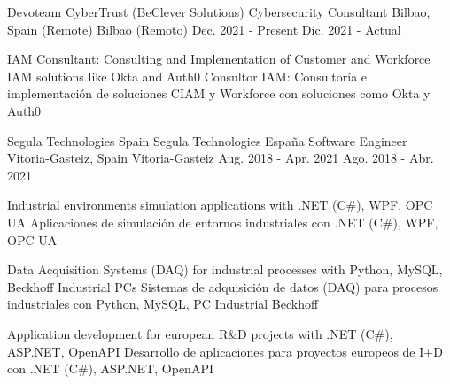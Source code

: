 	{}
	{}

\begin{cventries}
		
	\cventry
		{
			Devoteam CyberTrust (BeClever Solutions)
		} %
		{
			Cybersecurity Consultant
		} %
		{
				{Bilbao, Spain (Remote)}
				{Bilbao  (Remoto)}
		} %
		{
				{Dec. 2021 - Present}
				{Dic. 2021 - Actual}
		} %
		{
			\begin{cvitems} %
				\item {
						{IAM Consultant: Consulting and Implementation of Customer and Workforce IAM solutions like Okta and Auth0}
						{Consultor IAM: Consultoría e implementación de soluciones CIAM y Workforce con soluciones como Okta y Auth0}
					}
			\end{cvitems}
		}
		
	\cventry
	{
			{Segula Technologies Spain}
			{Segula Technologies España}
	} %
	{
		Software Engineer 
	} %
	{
			{Vitoria-Gasteiz, Spain}
			{Vitoria-Gasteiz}
	} %
	{
			{Aug. 2018 - Apr. 2021}
			{Ago. 2018 - Abr. 2021}
	} %
	{
		\begin{cvitems} %
			\item {
					{Industrial environments simulation applications with .NET (C\#), WPF, OPC UA}
					{Aplicaciones de simulación de entornos industriales con .NET (C\#), WPF, OPC UA}
			}
			\item {
					{Data Acquisition Systems (DAQ) for industrial processes with Python, MySQL, Beckhoff Industrial PCs}
					{Sistemas de adquisición de datos (DAQ) para procesos industriales con Python, MySQL, PC Industrial Beckhoff}
			}
			\item {
					{Application development for european R\&D projects with .NET (C\#), ASP.NET, OpenAPI}
					{Desarrollo de aplicaciones para proyectos europeos de I+D con .NET (C\#), ASP.NET, OpenAPI}
			}
		\end{cvitems}
	}
	

\end{cventries}
